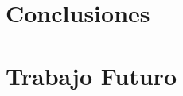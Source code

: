 \chapter{Conclusiones}
\label{chapter:conclusiones}


\chapter{Trabajo Futuro}
\label{chapter:trabajofuturo}



